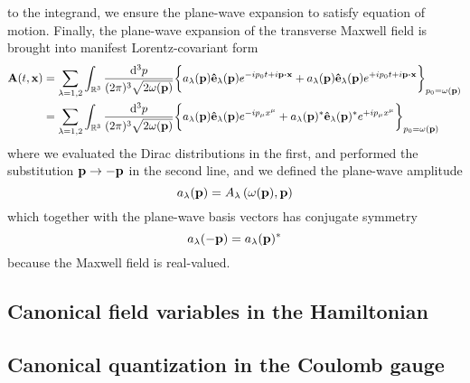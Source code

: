 to the integrand, we ensure the plane-wave expansion to satisfy equation of motion.
Finally, the plane-wave expansion of the transverse Maxwell field is brought into manifest Lorentz-covariant form
\begin{equation}
	\begin{split}
		\vb{A}(t,\vb{x})
		&=
		\sum_{\lambda=1,2}
		\int_{\mathbb{R}^3}\frac{\dd[3]{p}}{(2\pi)^3\sqrt{2\omega(\vb{p})}}
		\biggl\{
			a_\lambda(\vb{p})
			\vu{e}_\lambda(\vb{p})
			e^{-ip_0t+i\vb{p}\vdot\vb{x}}
			+
			a_\lambda(\vb{p})
			\vu{e}_\lambda(\vb{p})
			e^{+ip_0t+i\vb{p}\vdot\vb{x}}
		\biggr\}_{p_0=\omega(\vb{p})}
		\\
		&=
		\sum_{\lambda=1,2}
		\int_{\mathbb{R}^3}\frac{\dd[3]{p}}{(2\pi)^3\sqrt{2\omega(\vb{p})}}
		\biggl\{
			a_\lambda(\vb{p})
			\vu{e}_\lambda(\vb{p})
			e^{-ip_\mu x^\mu}
			+
			a_\lambda(\vb{p})^*
			\vu{e}_\lambda(\vb{p})^*
			e^{+ip_\mu x^\mu}
		\biggr\}_{p_0=\omega(\vb{p})}
	\end{split}
\end{equation}
where we evaluated the Dirac distributions in the first, and performed the substitution $\vb{p}\to-\vb{p}$ in the second line, and we defined the plane-wave amplitude
\begin{equation}
	a_\lambda(\vb{p})
	=
	A_\lambda\left(\omega(\vb{p}),\vb{p}\right)
\end{equation}
which together with the plane-wave basis vectors has conjugate symmetry
\begin{equation}
	a_\lambda(-\vb{p})
	=
	a_\lambda(\vb{p})^*	
\end{equation}
because the Maxwell field is real-valued.

\subsection{Canonical field variables in the Hamiltonian}

\subsection{Canonical quantization in the Coulomb gauge}